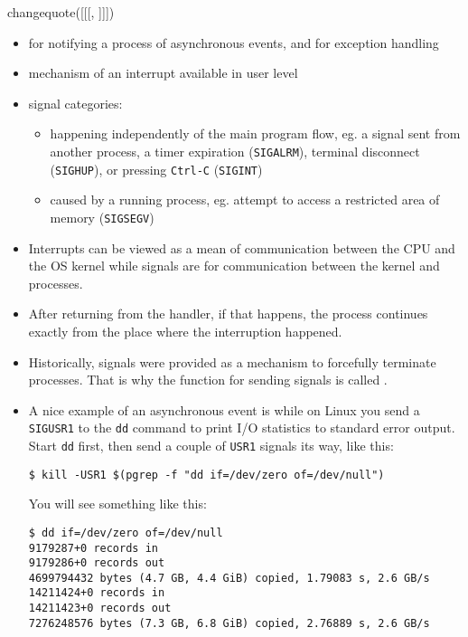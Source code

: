 


changequote([[[, ]]])

\begin{slide}
\begin{itemize}
\item for notifying a process of asynchronous events, and for exception handling
\item mechanism of an interrupt available in user level
\item signal categories:
    \begin{itemize}
    \item {} happening independently of the main program
    flow, eg. a signal sent from another process, a timer expiration
    (\texttt{SIGALRM}), terminal disconnect (\texttt{SIGHUP}), or pressing
    \texttt{Ctrl-C} (\texttt{SIGINT})
    \item {} caused by a running process, eg.
    attempt to access a restricted area of memory (\texttt{SIGSEGV})
    \end{itemize}
\end{itemize}
\end{slide}

\label{SIGNALS}

\begin{itemize}
\item Interrupts can be viewed as a mean of communication between the CPU and
the OS kernel while signals are for communication between the kernel and
processes.
\item After returning from the handler, if that happens, the process continues
exactly from the place where the interruption happened.
\item Historically, signals were provided as a mechanism to forcefully terminate
processes.  That is why the function for sending signals is called
.
\item A nice example of an asynchronous event is while on Linux you send
a \texttt{SIGUSR1} to the \texttt{dd} command to print I/O statistics to
standard error output.  Start \texttt{dd} first, then send a couple of
\texttt{USR1} signals its way, like this:

\begin{verbatim}
$ kill -USR1 $(pgrep -f "dd if=/dev/zero of=/dev/null")
\end{verbatim}

You will see something like this:

\begin{verbatim}
$ dd if=/dev/zero of=/dev/null
9179287+0 records in
9179286+0 records out
4699794432 bytes (4.7 GB, 4.4 GiB) copied, 1.79083 s, 2.6 GB/s
14211424+0 records in
14211423+0 records out
7276248576 bytes (7.3 GB, 6.8 GiB) copied, 2.76889 s, 2.6 GB/s
\end{verbatim}
\end{itemize}

